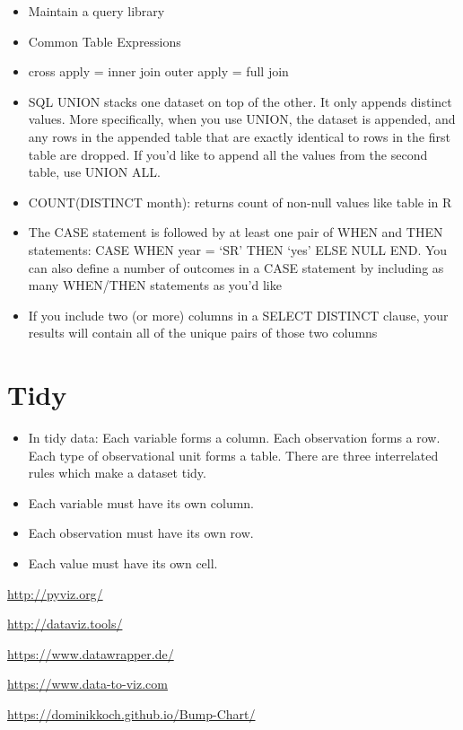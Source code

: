 \documentclass[]{book}
\begin{document}
\begin{itemize}
\item
  Maintain a query library
\item
  Common Table Expressions
\item
  cross apply = inner join \textbar{} outer apply = full join
\item
  SQL UNION stacks one dataset on top of the other. It only appends
  distinct values. More specifically, when you use UNION, the dataset is
  appended, and any rows in the appended table that are exactly
  identical to rows in the first table are dropped. If you'd like to
  append all the values from the second table, use UNION ALL.
\item
  COUNT(DISTINCT month): returns count of non-null values like table in
  R
\item
  The CASE statement is followed by at least one pair of WHEN and THEN
  statements: CASE WHEN year = `SR' THEN `yes' ELSE NULL END. You can
  also define a number of outcomes in a CASE statement by including as
  many WHEN/THEN statements as you'd like
\item
  If you include two (or more) columns in a SELECT DISTINCT clause, your
  results will contain all of the unique pairs of those two columns
\end{itemize}

\section{Tidy}\label{tidy-1}

\begin{itemize}
\item
  In tidy data: Each variable forms a column. Each observation forms a
  row. Each type of observational unit forms a table. There are three
  interrelated rules which make a dataset tidy.
\item
  Each variable must have its own column.
\item
  Each observation must have its own row.
\item
  Each value must have its own cell.
\end{itemize}

\url{http://pyviz.org/}

\url{http://dataviz.tools/}

\url{https://www.datawrapper.de/}

\url{https://www.data-to-viz.com}

\url{https://dominikkoch.github.io/Bump-Chart/}
\end{document}
